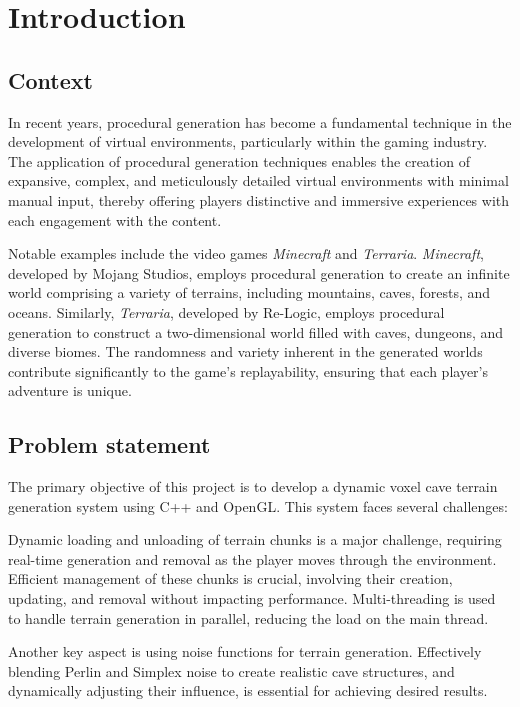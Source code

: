 \chapter{Introduction}
\label{chapter1}

\section{Context}

In recent years, procedural generation has become a fundamental technique in the development of virtual environments, particularly within the gaming industry. 
The application of procedural generation techniques enables the creation of expansive, complex, and meticulously detailed virtual environments with minimal manual input, thereby offering players distinctive and immersive experiences with each engagement with the content.

Notable examples include the video games \textit{Minecraft} and \textit{Terraria}. 
\textit{Minecraft}, developed by Mojang Studios, employs procedural generation to create an infinite world comprising a variety of terrains, including mountains, caves, forests, and oceans. 
Similarly, \textit{Terraria}, developed by Re-Logic, employs procedural generation to construct a two-dimensional world filled with caves, dungeons, and diverse biomes. 
The randomness and variety inherent in the generated worlds contribute significantly to the game's replayability, ensuring that each player's adventure is unique.

\section{Problem statement}

The primary objective of this project is to develop a dynamic voxel cave terrain generation system using C++ and OpenGL. This system faces several challenges:

Dynamic loading and unloading of terrain chunks is a major challenge, requiring real-time generation and removal as the player moves through the environment. Efficient management of these chunks is crucial, involving their creation, updating, and removal without impacting performance. Multi-threading is used to handle terrain generation in parallel, reducing the load on the main thread.

Another key aspect is using noise functions for terrain generation. Effectively blending Perlin and Simplex noise to create realistic cave structures, and dynamically adjusting their influence, is essential for achieving desired results.

